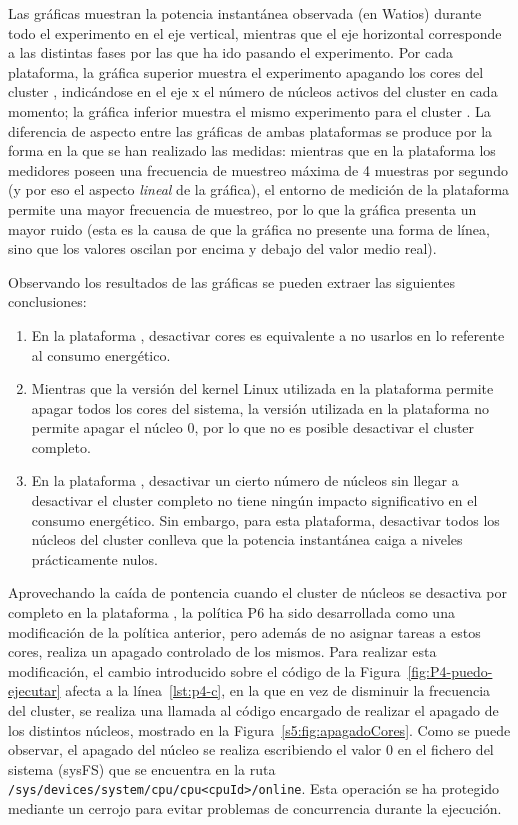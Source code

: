 Las gráficas muestran la potencia instantánea observada (en Watios) durante
todo el experimento en el eje vertical, mientras que el eje horizontal
corresponde a las distintas fases por las que ha ido pasando el
experimento. Por cada plataforma, la gráfica superior muestra el
experimento apagando los cores del cluster \BIG, indicándose en el eje x el
número de núcleos activos del cluster en cada momento; la gráfica inferior
muestra el mismo experimento para el cluster \LITTLE. La diferencia de
aspecto entre las gráficas de ambas plataformas se produce por la forma en
la que se han realizado las medidas: mientras que en la plataforma \odroid
los medidores poseen una frecuencia de muestreo máxima de 4 muestras por
segundo (y por eso el aspecto \emph{lineal} de la gráfica), el entorno de
medición de la plataforma \juno permite una mayor frecuencia de muestreo,
por lo que la gráfica presenta un mayor ruido (esta es la causa de que la
gráfica no presente una forma de línea, sino que los valores oscilan por
encima y debajo del valor medio real).

Observando los resultados de las gráficas se pueden extraer las siguientes
conclusiones:

\begin{enumerate}
\item En la plataforma \juno, desactivar cores es equivalente a no usarlos
  en lo referente al consumo energético.
\item Mientras que la versión del kernel Linux utilizada en la plataforma
  \juno permite apagar todos los cores del sistema, la versión utilizada en
  la plataforma \odroid no permite apagar el núcleo 0, por lo que no es
  posible desactivar el cluster \LITTLE completo.
\item En la plataforma \odroid, desactivar un cierto número de núcleos sin
  llegar a desactivar el cluster completo no tiene ningún impacto
  significativo en el consumo energético. Sin embargo, para esta
  plataforma, desactivar todos los núcleos del cluster \BIG conlleva que 
		la potencia instantánea caiga a niveles prácticamente nulos.
\end{enumerate}


Aprovechando la caída de pontencia cuando el cluster de
núcleos \BIG se desactiva por completo en la plataforma \odroid, la política
P6 ha sido desarrollada como una modificación de la política anterior, pero
además de no asignar tareas a estos cores, realiza un apagado controlado de
los mismos. Para realizar esta modificación, el cambio introducido sobre el
código de la Figura~\ref{fig:P4-puedo-ejecutar} afecta a la
línea~\ref{lst:p4-c}, en la que en vez de disminuir la frecuencia del
cluster, se realiza una llamada al código encargado de realizar el apagado
de los distintos núcleos, mostrado en la
Figura~\ref{s5:fig:apagadoCores}. Como se puede observar, el apagado del
núcleo se realiza escribiendo el valor 0 en el fichero del sistema ({\sc sysFS}) que se
encuentra en la ruta
\texttt{/sys/devices/system/cpu/cpu<cpuId>/online}. Esta operación se ha protegido
mediante un cerrojo para evitar problemas de concurrencia
durante la ejecución.



